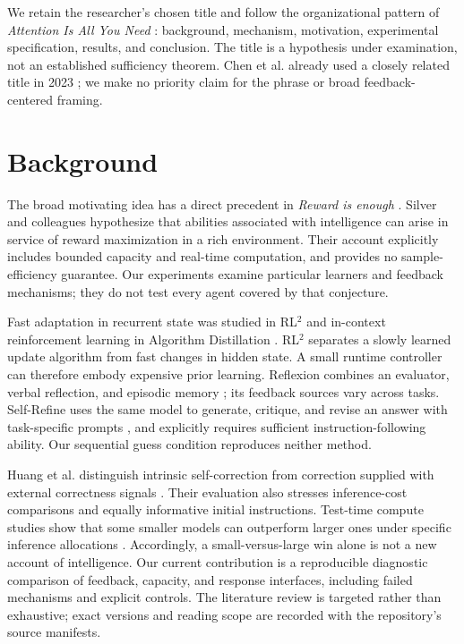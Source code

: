 \documentclass[11pt]{article}
\begin{document}
We retain the researcher's chosen title and follow the organizational pattern
of \emph{Attention Is All You Need} \cite{vaswani}: background, mechanism,
motivation, experimental specification, results, and conclusion. The title is
a hypothesis under examination, not an established sufficiency theorem.
Chen et al. already used a closely related title in 2023 \cite{chen}; we make
no priority claim for the phrase or broad feedback-centered framing.

\section{Background}
The broad motivating idea has a direct precedent in \emph{Reward is enough}
\cite{silver}. Silver and colleagues hypothesize that abilities associated with
intelligence can arise in service of reward maximization in a rich environment.
Their account explicitly includes bounded capacity and real-time computation,
and provides no sample-efficiency guarantee. Our experiments examine particular
learners and feedback mechanisms; they do not test every agent covered by that
conjecture.

Fast adaptation in recurrent state was studied in RL$^2$ \cite{duan} and
in-context reinforcement learning in Algorithm Distillation \cite{laskin}.
RL$^2$ separates a slowly learned update algorithm from fast changes in hidden
state. A small runtime controller can therefore embody expensive prior learning.
Reflexion combines an evaluator, verbal reflection, and episodic memory
\cite{shinn}; its feedback sources vary across tasks. Self-Refine uses the same
model to generate, critique, and revise an answer with task-specific prompts
\cite{madaan}, and explicitly requires sufficient instruction-following ability.
Our sequential guess condition reproduces neither method.

Huang et al. distinguish intrinsic self-correction from correction supplied
with external correctness signals \cite{huang}. Their evaluation also stresses
inference-cost comparisons and equally informative initial instructions.
Test-time compute studies show that some smaller models can outperform larger
ones under specific inference allocations \cite{snell}. Accordingly, a
small-versus-large win alone is not a new account of intelligence. Our current
contribution is a reproducible diagnostic comparison of feedback, capacity,
and response interfaces, including failed mechanisms and explicit controls.
The literature review is targeted rather than exhaustive; exact versions and
reading scope are recorded with the repository's source manifests.
\end{document}
